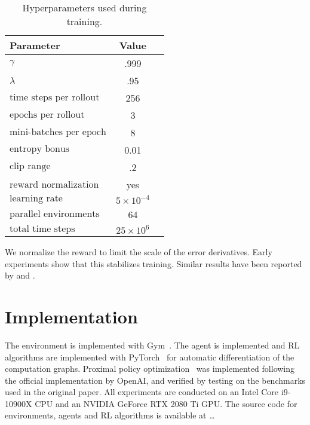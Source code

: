\begin{table}
    \centering
    \caption{Hyperparameters used during training.}
    \begin{tabular}{lcc}
        \toprule
        \textbf{Parameter} & \textbf{Value} \\
        \midrule
        \(\gamma\) & .999 \\
        \(\lambda\) & .95 \\
        \(\text{time steps per rollout}\) & 256 \\
        \(\text{epochs per rollout}\) & 3 \\
        \(\text{mini-batches per epoch}\) & 8 \\
        \(\text{entropy bonus}\) & 0.01 \\
        \(\text{clip range}\) & .2 \\
        \(\text{reward normalization}\) & yes \\
        \(\text{learning rate}\) & \(5 \times 10^{-4}\) \\
        \(\text{parallel environments}\) & 64 \\
        \(\text{total time steps}\) & \(25 \times 10^6\) \\
        \bottomrule
    \end{tabular}
    \label{tab:hyperparameters}
\end{table}

We normalize the reward to limit the scale of the error derivatives.
Early experiments show that this stabilizes training.
Similar results have been reported by \cite{andrychowicz_empirical_2020} and \cite{mnih_atari_2013}.

\section{Implementation}

The environment is implemented with Gym~\cite{brockman_gym_2016}. The agent is implemented and RL algorithms are implemented with PyTorch~\cite{paszke_pytorch_nodate} for automatic differentiation of the computation graphs.
Proximal policy optimization~\cite{schulman_ppo_2017} was implemented following the official implementation by OpenAI,
and verified by testing on the benchmarks used in the original paper.
All experiments are conducted on an Intel Core i9-10900X CPU and an NVIDIA GeForce RTX 2080 Ti GPU.
The source code for environments, agents and RL algorithms is available at \dots
{}

